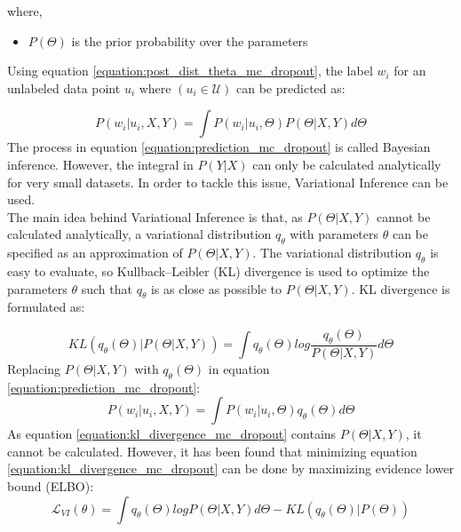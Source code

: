 where,
\begin{itemize}[label={}]
  \setlength\itemsep{0em}
  \item $P (\Theta)$ is the prior probability over the parameters
\end{itemize}
Using equation \ref{equation:post_dist_theta_mc_dropout}, the label $w_i$ for an unlabeled data point $u_i$ where $(u_i\in\mathcal{U})$ can be predicted as:

\begin{equation}
    \label{equation:prediction_mc_dropout}
    P(w_i | u_i, X, Y) = \int P(w_i|u_i, \Theta)P(\Theta|X, Y)d\Theta
\end{equation}
The process in equation \ref{equation:prediction_mc_dropout} is called Bayesian inference. However, the integral in $P(Y|X)$ can only be calculated analytically for very small datasets. In order to tackle this issue, Variational Inference can be used. \\
The main idea behind Variational Inference is that, as $P(\Theta | X, Y)$ cannot be calculated analytically, a variational distribution $q_\theta$ with parameters $\theta$ can be specified as an approximation of $P(\Theta | X, Y)$. The variational distribution $q_\theta$ is easy to evaluate, so Kullback–Leibler (KL) divergence\cite{kullback1951} is used to optimize the parameters $\theta$ such that $q_\theta$ is as close as possible to $P(\Theta | X, Y)$. KL divergence is formulated as:

\begin{equation}
    \label{equation:kl_divergence_mc_dropout}
    KL(q_\theta(\Theta)|P(\Theta| X, Y)) = \int{q_\theta(\Theta)log\frac{q_\theta(\Theta)}{P(\Theta| X, Y)}d\Theta}
\end{equation}
Replacing $P(\Theta| X, Y)$ with $q_\theta(\Theta)$ in equation \ref{equation:prediction_mc_dropout}:
\begin{equation}
    \label{equation:prediction_replaced_mc_dropout}
    P(w_i | u_i, X, Y) = \int P(w_i|u_i, \Theta)q_\theta(\Theta)d\Theta
\end{equation}
As equation \ref{equation:kl_divergence_mc_dropout} contains $P(\Theta| X, Y)$, it cannot be calculated. However, it has been found that minimizing equation \ref{equation:kl_divergence_mc_dropout} can be done by maximizing evidence lower bound (ELBO)\cite{bishop2006}:
\begin{equation}
    \label{equation:evidence_lower_bound_mc_dropout}
    \mathcal{L}_{VI}(\theta) = \int{q_\theta(\Theta)logP(\Theta| X, Y)d\Theta - KL(q_\theta(\Theta)|P(\Theta))}
\end{equation}

